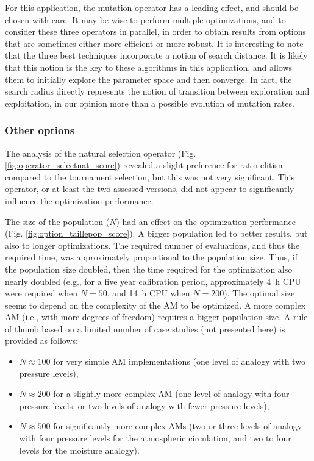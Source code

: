 \documentclass{ametsoc}
\begin{document}
For this application, the mutation operator has a leading effect, and should be chosen with care. It may be wise to perform multiple optimizations, and to consider these three operators in parallel, in order to obtain results from options that are sometimes either more efficient or more robust. It is interesting to note that the three best techniques incorporate a notion of search distance. It is likely that this notion is the key to these algorithms in this application, and allows them to initially explore the parameter space and then converge. In fact, the search radius directly represents the notion of transition between exploration and exploitation, in our opinion more than a possible evolution of mutation rates.


\subsubsection{Other options}

The analysis of the natural selection operator (Fig. \ref{fig:operator_selectnat_score}) revealed a slight preference for ratio-elitism compared to the tournament selection, but this was not very significant. This operator, or at least the two assessed versions, did not appear to significantly influence the optimization performance.

The size of the population ($N$) had an effect on the optimization performance (Fig. \ref{fig:option_taillepop_score}). A bigger population led to better results, but also to longer optimizations. The required number of evaluations, and thus the required time, was approximately proportional to the population size. Thus, if the population size doubled, then the time required for the optimization also nearly doubled (e.g., for a five year calibration period, approximately 4~h CPU were required when $N = 50$, and 14~h CPU when $N = 200$). The optimal size seems to depend on the complexity of the AM to be optimized. A more complex AM (i.e., with more degrees of freedom) requires a bigger population size. A rule of thumb based on a limited number of case studies (not presented here) is provided as follows:

\begin{itemize}
	\item $N\approx100$ for very simple AM implementations (one level of analogy with two pressure levels),
	\item $N\approx200$ for a slightly more complex AM (one level of analogy with four pressure levels, or two levels of analogy with fewer pressure levels),
	\item $N\approx500$ for significantly more complex AMs (two or three levels of analogy with four pressure levels for the atmospheric circulation, and two to four levels for the moisture analogy).
\end{itemize}
\end{document}
